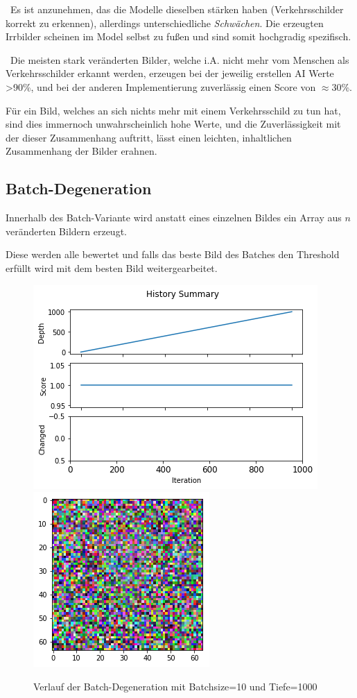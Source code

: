 ~\newline Es ist anzunehmen, das die Modelle dieselben stärken haben (Verkehrsschilder korrekt zu erkennen), allerdings unterschiedliche \textit{Schwächen}. Die erzeugten Irrbilder scheinen im Model selbst zu fußen und sind somit hochgradig spezifisch. 

~\newline Die meisten stark veränderten Bilder, welche i.A. nicht mehr vom Menschen als Verkehrsschilder erkannt werden, erzeugen bei der jeweilig erstellen AI Werte >90\%, und bei der anderen Implementierung zuverlässig einen Score von $\approx$30\%. 

Für ein Bild, welches an sich nichts mehr mit einem Verkehrsschild zu tun hat, sind dies immernoch unwahrscheinlich hohe Werte, und die Zuverlässigkeit mit der dieser Zusammenhang auftritt, lässt einen leichten, inhaltlichen Zusammenhang der Bilder erahnen.

\newpage
\subsection{Batch-Degeneration}
Innerhalb des Batch-Variante wird anstatt eines einzelnen Bildes ein Array aus $n$ veränderten Bildern erzeugt. 

Diese werden alle bewertet und falls das beste Bild des Batches den Threshold erfüllt wird mit dem besten Bild weitergearbeitet. 

\begin{figure}[h]
	\centering
	\includegraphics[width=0.5\linewidth]{Images/DegenSamples/BatchDegPlotTiefe1000}
	\includegraphics[width=0.35\linewidth]{Images/DegenSamples/BatchDegTiefe1000}
	\caption[Batch-Degeneration-Plot]{Verlauf der Batch-Degeneration mit Batchsize=10 und Tiefe=1000}
	\label{fig:batchdegplottiefe1000}
\end{figure}

